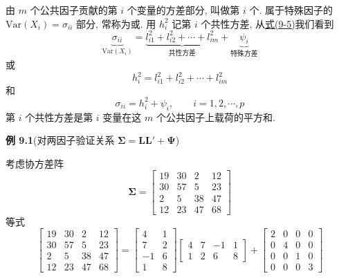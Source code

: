 由 $m$ 个公共因子贡献的第 $i$ 个变量的方差部分, 叫做第 $i$ 个. 属于特殊因子的 $\mathrm{Var}(X_i)=\sigma_{ii}$ 部分, 常称为或. 用 $h_i^2$ 记第 $i$ 个共性方差, 从\hyperref[eq:9-5]{式(9-5)}我们看到
\[
\underbrace{\sigma_{ii}}_{\mathrm{Var}(X_i)}=\underbrace{l_{i1}^2+l_{i2}^2+\cdots+l_{im}^2}_{\text{共性方差}}+\underbrace{\psi_i}_{\text{特殊方差}}
\]
或
\label{eq:9-6}
\begin{equation}
h_i^2=l_{i1}^2+l_{i2}^2+\cdots+l_{im}^2
\tag{9-6}
\end{equation}
和
\[
\sigma_{ii}=h_i^2+\psi_i,\qquad i=1,2,\cdots,p
\]
第 $i$ 个共性方差是第 $i$ 变量在这 $m$ 个公共因子上载荷的平方和.

\noindent\textbf{例 9.1}\quad (对两因子验证关系 $\boldsymbol{\Sigma}=\mathbf{L}\mathbf{L}'+\boldsymbol{\Psi}$)

考虑协方差阵
\[
\boldsymbol{\Sigma}=\begin{bmatrix}
19&30&2&12\\
30&57&5&23\\
2&5&38&47\\
12&23&47&68
\end{bmatrix}
\]
等式
\[
\begin{bmatrix}
19&30&2&12\\
30&57&5&23\\
2&5&38&47\\
12&23&47&68
\end{bmatrix}
=\begin{bmatrix}4&1\\7&2\\-1&6\\1&8\end{bmatrix}
\begin{bmatrix}4&7&-1&1\\1&2&6&8\end{bmatrix}
+\begin{bmatrix}
2&0&0&0\\
0&4&0&0\\
0&0&1&0\\
0&0&0&3
\end{bmatrix}
\]
